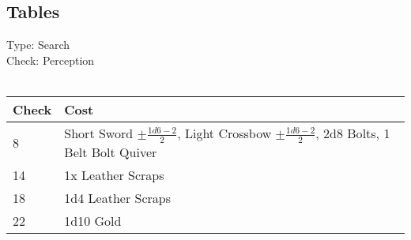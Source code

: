 \subsection{Tables}
Type: Search\\
Check: Perception\\
\\
\begin{minipage}{0.8\textwidth}
	\begin{tabular}{|l | p{11cm}|}
		\hline
		Check & Cost\\
		\hline
		8 & Short Sword $\pm \frac{1d6 - 2}{2}$, Light Crossbow $\pm \frac{1d6 - 2}{2}$, 2d8 Bolts, 1 Belt Bolt Quiver\\
		14 & 1x Leather Scraps\\
		18 & 1d4 Leather Scraps\\
		22 & 1d10 Gold\\
		\hline
	\end{tabular}
\end{minipage}
\pagebreak